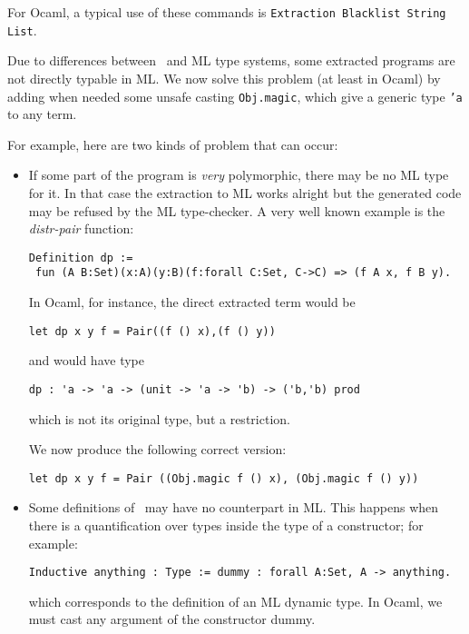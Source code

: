 \noindent For Ocaml, a typical use of these commands is
{\tt Extraction Blacklist String List}.



Due to differences between \Coq\ and ML type systems, 
some extracted programs are not directly typable in ML. 
We now solve this problem (at least in Ocaml) by adding 
when needed some unsafe casting {\tt Obj.magic}, which give
a generic type {\tt 'a} to any term.

For example, here are two kinds of problem that can occur:

\begin{itemize}
  \item If some part of the program is {\em very} polymorphic, there
    may be no ML type for it. In that case the extraction to ML works
    alright but the generated code may be refused by the ML
    type-checker. A very well known example is the {\em distr-pair}
    function:
\begin{verbatim}
Definition dp := 
 fun (A B:Set)(x:A)(y:B)(f:forall C:Set, C->C) => (f A x, f B y).
\end{verbatim}

In Ocaml, for instance, the direct extracted term would be
\begin{verbatim}
let dp x y f = Pair((f () x),(f () y))
\end{verbatim}

and would have type
\begin{verbatim}
dp : 'a -> 'a -> (unit -> 'a -> 'b) -> ('b,'b) prod
\end{verbatim}

which is not its original type, but a restriction.

We now produce the following correct version:
\begin{verbatim}
let dp x y f = Pair ((Obj.magic f () x), (Obj.magic f () y))
\end{verbatim}

  \item Some definitions of \Coq\ may have no counterpart in ML. This
    happens when there is a quantification over types inside the type
    of a constructor; for example:
\begin{verbatim}
Inductive anything : Type := dummy : forall A:Set, A -> anything.
\end{verbatim}

which corresponds to the definition of an ML dynamic type.
In Ocaml, we must cast any argument of the constructor dummy.

\end{itemize}

